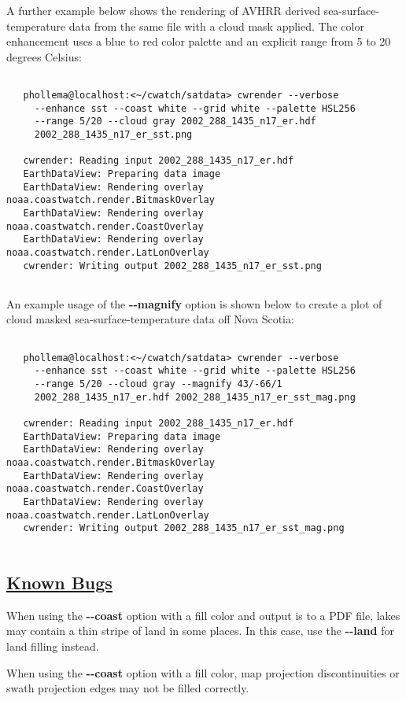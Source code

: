  A further example below shows the rendering of AVHRR derived sea-surface-temperature data from the same file with a cloud mask applied. The color enhancement uses a blue to red color palette and an explicit range from 5 to 20 degrees Celsius: \begin{verbatim}

   phollema@localhost:<~/cwatch/satdata> cwrender --verbose 
     --enhance sst --coast white --grid white --palette HSL256
     --range 5/20 --cloud gray 2002_288_1435_n17_er.hdf 
     2002_288_1435_n17_er_sst.png

   cwrender: Reading input 2002_288_1435_n17_er.hdf
   EarthDataView: Preparing data image
   EarthDataView: Rendering overlay noaa.coastwatch.render.BitmaskOverlay
   EarthDataView: Rendering overlay noaa.coastwatch.render.CoastOverlay
   EarthDataView: Rendering overlay noaa.coastwatch.render.LatLonOverlay
   cwrender: Writing output 2002_288_1435_n17_er_sst.png
 
\end{verbatim}
 An example usage of the \textbf{-{-}magnify}
 option is shown below to create a plot of cloud masked sea-surface-temperature data off Nova Scotia: \begin{verbatim}

   phollema@localhost:<~/cwatch/satdata> cwrender --verbose 
     --enhance sst --coast white --grid white --palette HSL256 
     --range 5/20 --cloud gray --magnify 43/-66/1 
     2002_288_1435_n17_er.hdf 2002_288_1435_n17_er_sst_mag.png

   cwrender: Reading input 2002_288_1435_n17_er.hdf
   EarthDataView: Preparing data image
   EarthDataView: Rendering overlay noaa.coastwatch.render.BitmaskOverlay
   EarthDataView: Rendering overlay noaa.coastwatch.render.CoastOverlay
   EarthDataView: Rendering overlay noaa.coastwatch.render.LatLonOverlay
   cwrender: Writing output 2002_288_1435_n17_er_sst_mag.png
 
\end{verbatim}

\subsection*{\underline{Known Bugs}}


 When using the \textbf{-{-}coast}
 option with a fill color and output is to a PDF file, lakes may contain a thin stripe of land in some places. In this case, use the \textbf{-{-}land}
 for land filling instead.


 When using the \textbf{-{-}coast}
 option with a fill color, map projection discontinuities or swath projection edges may not be filled correctly.


